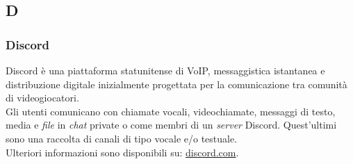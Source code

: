 \subsection{D}
\subsubsection{Discord}
Discord è una piattaforma statunitense di VoIP, messaggistica istantanea e
distribuzione digitale inizialmente progettata per la comunicazione tra comunità
di videogiocatori.\\
Gli utenti comunicano con chiamate vocali, videochiamate, messaggi di testo,
media e \textit{file} in \textit{chat} private o come membri di un \textit{server}
Discord. Quest'ultimi sono una raccolta di canali di tipo vocale e/o testuale.\\
Ulteriori informazioni sono disponibili su:
\href{https://discord.com/}{discord.com}.

\newpage
